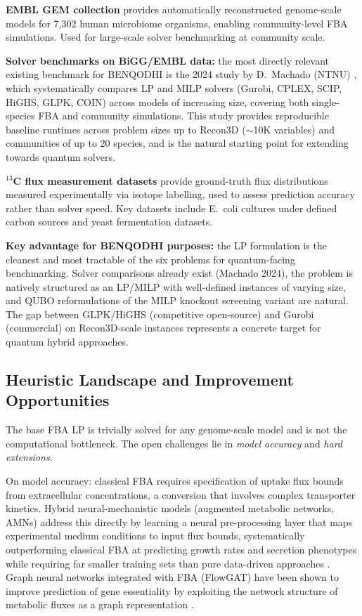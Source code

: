 \documentclass[11pt]{article}
\begin{document}
\textbf{EMBL GEM collection} \cite{Heinken2023} provides automatically reconstructed
genome-scale models for 7{,}302 human microbiome organisms, enabling community-level FBA
simulations. Used for large-scale solver benchmarking at community scale.

\textbf{Solver benchmarks on BiGG/EMBL data:} the most directly relevant existing
benchmark for BENQODHI is the 2024 study by D.~Machado (NTNU) \cite{Machado2024}, which
systematically compares LP and MILP solvers (Gurobi, CPLEX, SCIP, HiGHS, GLPK, COIN)
across models of increasing size, covering both single-species FBA and community
simulations. This study provides reproducible baseline runtimes across problem sizes up
to Recon3D ($\sim$10K variables) and communities of up to 20 species, and is the
natural starting point for extending towards quantum solvers.

\textbf{$^{13}$C flux measurement datasets} provide ground-truth flux distributions
measured experimentally via isotope labelling, used to assess prediction accuracy rather
than solver speed. Key datasets include E.~coli cultures under defined carbon sources
\cite{Antoniewicz2013} and yeast fermentation datasets.

\textbf{Key advantage for BENQODHI purposes:} the LP formulation is the cleanest and
most tractable of the six problems for quantum-facing benchmarking. Solver comparisons
already exist (Machado 2024), the problem is natively structured as an LP/MILP with
well-defined instances of varying size, and QUBO reformulations of the MILP knockout
screening variant are natural. The gap between GLPK/HiGHS (competitive open-source)
and Gurobi (commercial) on Recon3D-scale instances represents a concrete target for
quantum hybrid approaches.

\subsection*{Heuristic Landscape and Improvement Opportunities}

The base FBA LP is trivially solved for any genome-scale model and is not the 
computational bottleneck. The open challenges lie in \emph{model accuracy} 
and \emph{hard extensions}.

On model accuracy: classical FBA requires specification of uptake flux bounds 
from extracellular concentrations, a conversion that involves complex transporter 
kinetics. Hybrid neural-mechanistic models (augmented metabolic networks, AMNs) 
address this directly by learning a neural pre-processing layer that maps 
experimental medium conditions to input flux bounds, systematically outperforming 
classical FBA at predicting growth rates and secretion phenotypes while requiring 
far smaller training sets than pure data-driven approaches \cite{Millard2023}.
Graph neural networks integrated with FBA (FlowGAT) have been shown to improve 
prediction of gene essentiality by exploiting the network structure of metabolic 
fluxes as a graph representation \cite{FlowGAT2024}.
\end{document}
